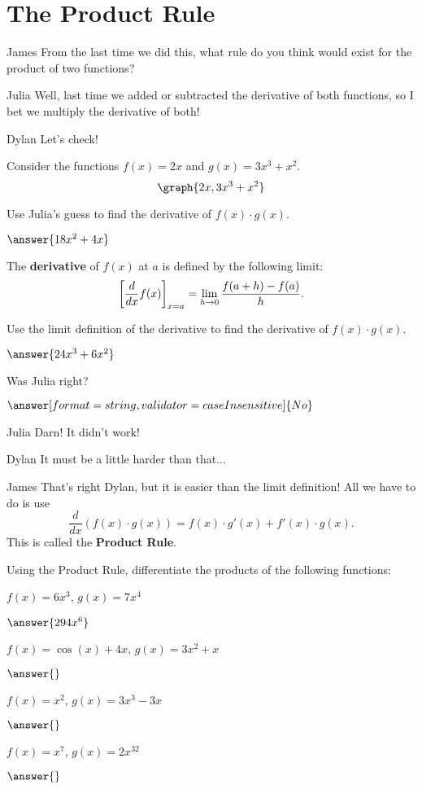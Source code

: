 \documentclass{ximera}
\begin{document}
\section{The Product Rule}
\begin{dialogue}
\item[James] From the last time we did this, what rule do you think would exist for the product of two functions?
\item[Julia] Well, last time we added or subtracted the derivative of both functions, so I bet we multiply the derivative of both!
\item[Dylan] Let's check!
\end{dialogue}
Consider the functions $f(x) = 2x$ and $g(x) = 3x^3 + x^2$.
\[
\graph{2x, 3x^3+x^2}
\]
\begin{question}
Use Julia's guess to find the derivative of $f(x) \cdot g(x)$.

$\answer{18x^2+4x}$

\begin{definition}
  The \textbf{derivative} of $f(x)$ at $a$ is defined by the following limit:
  \[
  \bigg[ \frac{d}{dx} f(x) \bigg]_{x=a} = \lim_{h\to 0} \frac{f(a+h) - f(a)}{h}.
  \]
\end{definition}

Use the limit definition of the derivative to find the derivative of $f(x) \cdot g(x)$.

$\answer{24x^3+6x^2}$

Was Julia right?

$\answer[format=string,validator=caseInsensitive]{No}$
\end{question}
\begin{dialogue}
\item[Julia] Darn! It didn't work!
\item[Dylan] It must be a little harder than that...
\item[James] That's right Dylan, but it is easier than the limit definition! All we have to do is use $$\frac{d}{dx}\left(f(x)\cdot g(x)\right)= f(x)\cdot g'(x) + f'(x)\cdot g(x)\text{.}$$ This is called the \textbf{Product Rule}.
\end{dialogue}
\begin{question}
Using the Product Rule, differentiate the products of the following functions:

$f(x) = 6x^3$, $g(x) = 7x^4$

$\answer{294x^6}$

$f(x) = \cos(x)+4x$, $g(x) = 3x^2+x$

$\answer{}$

$f(x) = x^2$, $g(x) = 3x^3-3x$

$\answer{}$

$f(x) = x^7$, $g(x) = 2x^{32}$

$\answer{}$

\end{question}
\end{document}
